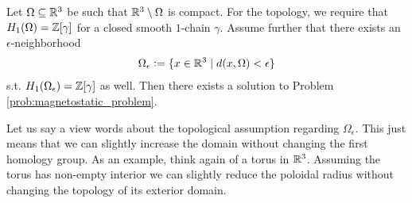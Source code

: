 \documentclass[../master_thesis.tex]{subfiles}
\begin{document}
\begin{theorem}\label{thm:existence}
    Let $\Omega \subseteq \mathbb{R}^3$ be such that $\mathbb{R}^3 \setminus \Omega$
    is compact. 
    For the topology, we require that $H_1(\Omega) = \mathbb{Z} [\gamma]$ 
    for a closed smooth $1$-chain 
    $\gamma$. Assume further that there exists an $\epsilon$-neighborhood 
    \begin{align*}
        \Omega_\epsilon \vcentcolon= \{ x \in \mathbb{R}^3 \mid
            d(x,\Omega) < \epsilon \} 
    \end{align*}
    s.t. $H_1(\Omega_\epsilon) = \mathbb{Z} [\gamma]$ as well.
    Then there exists a solution 
    to Problem \ref{prob:magnetostatic_problem}.
\end{theorem}
Let us say a view words about the topological assumption 
regarding $\Omega_\epsilon$. This just means that we can slightly increase 
the domain without changing the first homology group. As an example, 
think again of a torus in $\mathbb{R}^3$. Assuming the torus has non-empty interior 
we can slightly reduce the poloidal radius without changing the topology of its 
 exterior domain.
\end{document}

